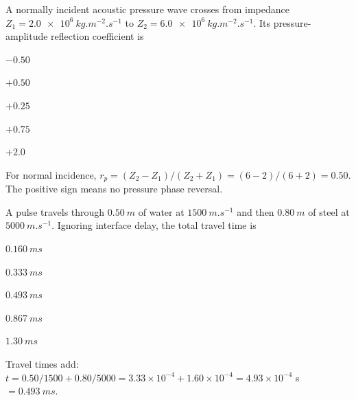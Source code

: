 \documentclass[10pt,a4paper,full]{physicsquiz}
\newcommand{\bankq}[9]{%
  \begin{quizquestion}[
    id=#1,
    topic={#2},
    difficulty=#3,
    marks=1,
    correct=#4,
    tags={#5},
    outcome={#6}
  ]
    #7
    \begin{choiceoptions}
      #8
    \end{choiceoptions}
  \end{quizquestion}
  \begin{quizsolution}
    #9
  \end{quizsolution}
}
\begin{document}
\begin{quizbank}
\bankq{media-099}{Propagation in Different Media}{challenge}{B}{media,impedance,reflection}{Calculate an amplitude reflection coefficient.}{%
A normally incident acoustic pressure wave crosses from impedance \(Z_1=\SI{2.0e6}{kg.m^{-2}.s^{-1}}\) to \(Z_2=\SI{6.0e6}{kg.m^{-2}.s^{-1}}\). Its pressure-amplitude reflection coefficient is}{%
\item \(-0.50\)
\item \(+0.50\)
\item \(+0.25\)
\item \(+0.75\)
\item \(+2.0\)}{%
For normal incidence, \(r_p=(Z_2-Z_1)/(Z_2+Z_1)=(6-2)/(6+2)=0.50\). The positive sign means no pressure phase reversal.}

\bankq{media-100}{Propagation in Different Media}{challenge}{C}{media,travel-time,multilayer}{Calculate travel time through layered media.}{%
A pulse travels through \(\SI{0.50}{m}\) of water at \(\SI{1500}{m.s^{-1}}\) and then \(\SI{0.80}{m}\) of steel at \(\SI{5000}{m.s^{-1}}\). Ignoring interface delay, the total travel time is}{%
\item \(\SI{0.160}{ms}\)
\item \(\SI{0.333}{ms}\)
\item \(\SI{0.493}{ms}\)
\item \(\SI{0.867}{ms}\)
\item \(\SI{1.30}{ms}\)}{%
Travel times add: \(t=0.50/1500+0.80/5000=3.33\times10^{-4}+1.60\times10^{-4}=4.93\times10^{-4}\) s \(=\SI{0.493}{ms}\).}

\end{quizbank}

\quizselectall
\let\storedquizmarks\quizmarks
\let\storedquizdifficulty\quizdifficulty
\renewcommand{\quizmarks}[1]{}
\renewcommand{\quizdifficulty}[1]{}
\printquizquestions[2]
\let\quizmarks\storedquizmarks
\let\quizdifficulty\storedquizdifficulty
\end{document}

